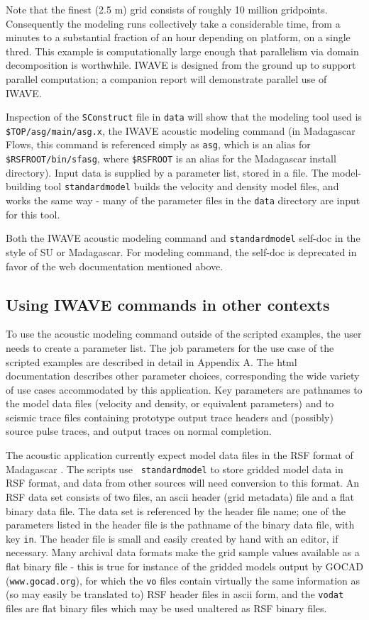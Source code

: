 Note that the finest (2.5 m) grid consists of roughly 10 million
gridpoints. Consequently the modeling runs collectively take a
considerable time, from a minutes to a substantial fraction of an hour
depending on platform,
on a single thred. This example is computationally large enough that
parallelism via domain decomposition is worthwhile. IWAVE is designed
from the ground up to support parallel computation; a companion report
will demonstrate parallel use of IWAVE.

Inspection of the {\tt SConstruct} file in {\tt data} will show that
the modeling tool used is {\tt \$TOP/asg/main/asg.x}, the IWAVE
acoustic modeling command (in Madagascar Flows, this command is referenced
simply as {\tt asg}, which is an alias for {\tt \$RSFROOT/bin/sfasg},
where {\tt \$RSFROOT} is an alias for the Madagascar install
directory). Input data is supplied by a parameter list, stored in a file.
The model-building tool {\tt standardmodel} builds the velocity and
density model files, and works the same way - many of the parameter
files in the {\tt data} directory are input for this tool.

Both the IWAVE acoustic modeling command and {\tt standardmodel}
self-doc in the style of SU or Madagascar. For modeling command, the
self-doc is deprecated in favor of the web documentation mentioned
above.

\subsection{Using IWAVE commands in other contexts}
To use the acoustic modeling command outside of the scripted examples,
the user needs to create a parameter list.  The job parameters for the
use case of the scripted examples are described in detail in Appendix
A. The html documentation \cite[]{IWAVE} describes other parameter
choices, corresponding the wide variety of use cases accommodated by
this application. Key parameters are pathnames to the model data files
(velocity and density, or equivalent parameters) and to seismic trace
files containing prototype output trace headers and (possibly) source
pulse traces, and output traces on normal completion.

The acoustic application currently expect model data files in the RSF
format of Madagascar \cite[]{Madagascar}. The scripts use {\tt
  standardmodel} to store gridded model data in RSF format, and data
from other sources will need conversion to this format. An RSF data
set consists of two files, an ascii header (grid metadata) file and a
flat binary data file. The data set is referenced by the header file
name; one of the parameters listed in the header file is the pathname
of the binary data file, with key {\tt in}. The header file is small
and easily created by hand with an editor, if necessary. Many archival
data formats make the grid sample values available as a flat binary
file - this is true for instance of the gridded models output by GOCAD
({\tt www.gocad.org}), for which the {\tt vo} files contain virtually
the same information as (so may easily be translated to) RSF header
files in ascii form, and the {\tt vodat} files are flat binary files
which may be used unaltered as RSF binary files.

